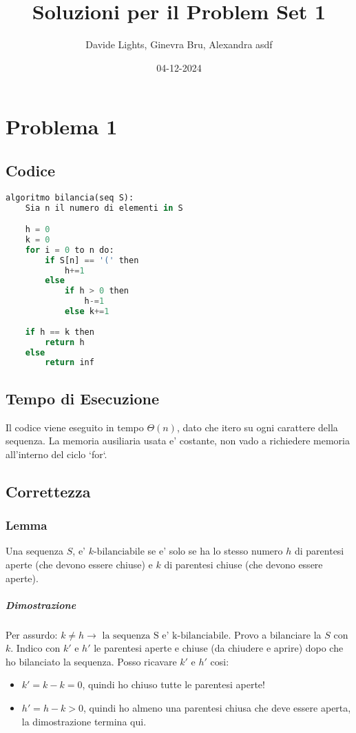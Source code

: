 \documentclass{article}
\title{Soluzioni per il Problem Set 1}
\date{04-12-2024}
\author{Davide Lights, Ginevra Bru, Alexandra asdf}
\begin{document}
\maketitle
{}
\newpage
{}

\section{ Problema 1 }

\subsection{ Codice }

\begin{lstlisting}[language=Python]
algoritmo bilancia(seq S):
    Sia n il numero di elementi in S

    h = 0
    k = 0
    for i = 0 to n do:
        if S[n] == '(' then
            h+=1
        else
            if h > 0 then 
                h-=1
            else k+=1
    
    if h == k then
        return h
    else 
        return inf
\end{lstlisting}

\subsection{ Tempo di Esecuzione }
    Il codice viene eseguito in tempo $\Theta(n)$, dato che itero su ogni carattere della sequenza. 
    La memoria ausiliaria usata e' costante, non vado a richiedere memoria all'interno del ciclo `for`.

\subsection{ Correttezza }
\subsubsection { Lemma }
    Una sequenza $S$, e' $k \text{-bilanciabile}$ se e' solo se 
    ha lo stesso numero $h$ di parentesi aperte (che devono essere chiuse) e $k$ di parentesi chiuse (che devono essere aperte). 

\subparagraph{ Dimostrazione }
    Per assurdo: $k \neq h \to \text{ la sequenza S e' k-bilanciabile}$. Provo a bilanciare la $S$ con $k$. Indico con $k'$ e $h'$ le parentesi aperte e chiuse (da chiudere e aprire)  dopo che ho bilanciato la sequenza. Posso ricavare $k'$ e $h'$ cosi:
    \begin{itemize}
        \item $k' = k - k = 0$, quindi ho chiuso tutte le parentesi aperte!
        \item $h' = h - k > 0$, quindi ho almeno una parentesi chiusa che deve essere aperta, la dimostrazione termina qui.
    \end{itemize}
\end{document}
